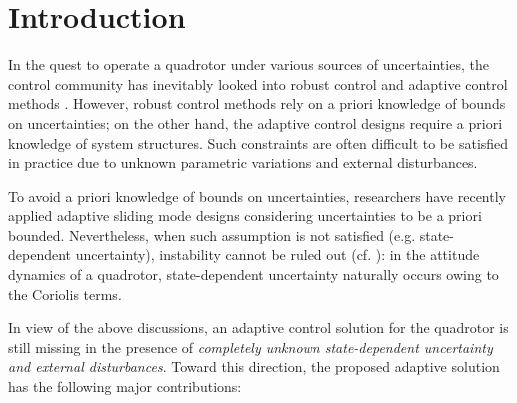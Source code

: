 \section{Introduction}
In the quest to operate a quadrotor under various sources of uncertainties, the control community has inevitably looked into robust control \cite{xu2008sliding, sanchez2012continuous, derafa2012super, madani2007sliding} and adaptive control methods \cite{nicol2011robust, bialy2013lyapunov, dydek2012adaptive, ha2014passivity, mofid2018adaptive, tran2018adaptive, tian2019adaptive, zhao2014nonlinear, yang2019energy}. However, robust control methods \cite{xu2008sliding, sanchez2012continuous, derafa2012super, madani2007sliding} rely on a priori knowledge of bounds on uncertainties; on the other hand, the adaptive control designs \cite{nicol2011robust, bialy2013lyapunov, dydek2012adaptive, ha2014passivity, tran2018adaptive, tian2019adaptive, zhao2014nonlinear, yang2019energy} require a priori knowledge of system structures. Such constraints are often difficult to be satisfied in practice due to unknown parametric variations and external disturbances. 

To avoid a priori knowledge of bounds on uncertainties, researchers have recently applied adaptive sliding mode designs \cite{mofid2018adaptive, shtessel2012novel, utkin2013adaptive, obeid2018barrier} considering uncertainties to be a priori bounded. Nevertheless, when such assumption is not satisfied (e.g. state-dependent uncertainty), instability cannot be ruled out (cf. \cite{roy2020adaptive, roy2020towards}): in the attitude dynamics of a quadrotor, state-dependent uncertainty naturally occurs owing to the Coriolis terms.

 In view of the above discussions, an adaptive control solution for the quadrotor is still missing in the presence of \textit{completely unknown state-dependent uncertainty and external disturbances}.
Toward this direction, the proposed adaptive solution has the following major contributions:

